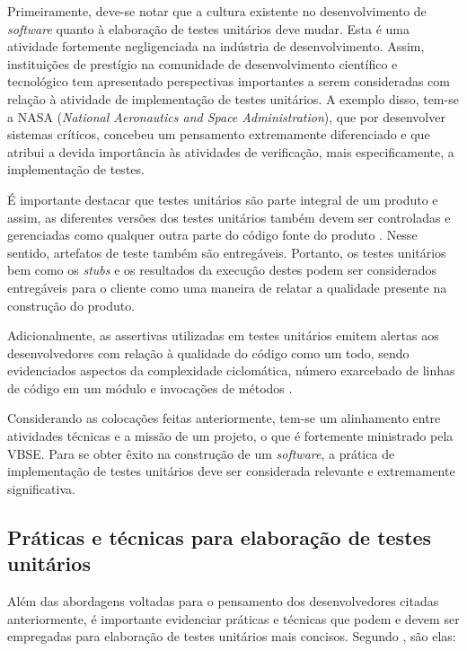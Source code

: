 Primeiramente, deve-se notar que a cultura existente no desenvolvimento de \textit{software} quanto à elaboração de testes unitários deve mudar. Esta é uma atividade fortemente negligenciada na indústria de desenvolvimento. Assim, instituições de prestígio na comunidade de desenvolvimento científico e tecnológico tem apresentado perspectivas importantes a serem consideradas com relação à atividade de implementação de testes unitários. A exemplo disso, tem-se a NASA (\textit{National Aeronautics and Space Administration}), que por desenvolver sistemas críticos, concebeu um pensamento extremamente diferenciado e que atribui a devida importância às atividades de verificação, mais especificamente, a implementação de testes.

É importante destacar que testes unitários são parte integral de um produto e assim, as diferentes versões dos testes unitários também devem ser controladas e gerenciadas como qualquer outra parte do código fonte do produto \cite{nasa}. Nesse sentido, artefatos de teste também são entregáveis. Portanto, os testes unitários bem como os \textit{stubs} e os resultados da execução destes podem ser considerados entregáveis para o cliente como uma maneira de relatar a qualidade presente na construção do produto.

Adicionalmente, as assertivas utilizadas em testes unitários emitem alertas aos desenvolvedores com relação à qualidade do código como um todo, sendo evidenciados aspectos da complexidade ciclomática, número exarcebado de linhas de código em um módulo e invocações de métodos \cite{asserts}.

Considerando as colocações feitas anteriormente, tem-se um alinhamento entre atividades técnicas e a missão de um projeto, o que é fortemente ministrado pela VBSE. Para se obter êxito na construção de um \textit{software}, a prática de implementação de testes unitários deve ser considerada relevante e extremamente significativa.

\subsection{Práticas e técnicas para elaboração de testes unitários}

Além das abordagens voltadas para o pensamento dos desenvolvedores citadas anteriormente, é importante evidenciar práticas e técnicas que podem e devem ser empregadas para elaboração de testes unitários mais concisos. Segundo \cite{nasa}, são elas:

